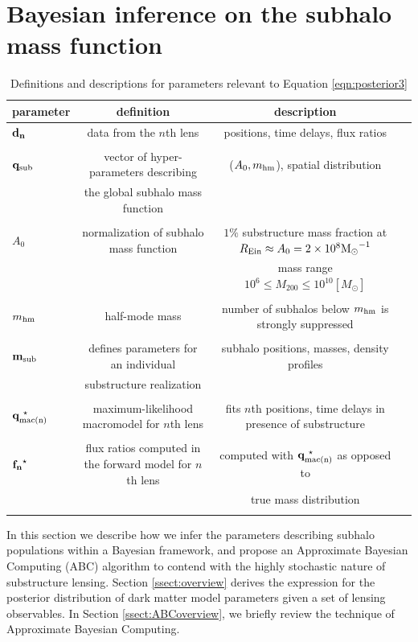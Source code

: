 \section{Bayesian inference on the subhalo mass function}
\label{sec:ABC}
\begin{landscape}
\begin{table}
	\centering
	\caption[Summary of model parameters]{Definitions and descriptions for parameters relevant to Equation \ref{eqn:posterior3}}
	\label{tab:notation}
	\begin{tabular}{lccr} %
		\hline
		parameter & definition & description\\
		\hline
		$\bf{d}_n$ & data from the $n$th lens & positions, time delays, flux ratios \\ \\ 
		${\bf{q}_{\rm{sub}}}$ & vector of hyper-parameters  describing & ($A_0,m_{\rm{hm}}$), spatial distribution \\ & the global subhalo mass function \\ \\ 
		$A_0$ & normalization of subhalo mass function & $1\%$ substructure mass fraction at $R_{\rm{Ein}} \approx A_0 = 2 \times 10^8 {\rm{M}_{\odot}}^{-1}$ \\ & & mass range $10^6 \leq M_{200} \leq 10^{10} \left[M_{\odot} \right]$ \\ \\
		$m_{\rm{hm}}$ & half-mode mass & number of subhalos below $m_{\rm{hm}}$ is strongly suppressed\\ \\
		${\bf{m}_{\rm{sub}}}$ & defines parameters for an individual & subhalo positions, masses, density profiles\\ & substructure realization & & \\ \\ 
		${\bf{q}_{\rm{mac(n)}}^{\ \star}}$ & maximum-likelihood macromodel for $n$th lens& fits $n$th positions, time delays in presence of substructure\\ \\
		${\bf{f_n}^{\star}}$ & flux ratios computed in the forward model for $n$th lens& computed with ${\bf{q}_{\rm{mac(n)}}^{\ \star}}$ as opposed to\\ & & true mass distribution \\ \\
		\hline		
	\end{tabular}
\end{table}
\end{landscape}

In this section we describe how we infer the parameters describing subhalo populations within a Bayesian framework, and propose an Approximate Bayesian Computing (ABC) algorithm to contend with the highly stochastic nature of substructure lensing. Section \ref{ssect:overview} derives the expression for the posterior distribution of dark matter model parameters given a set of lensing observables. In Section \ref{ssect:ABCoverview}, we briefly review the technique of Approximate Bayesian Computing.

